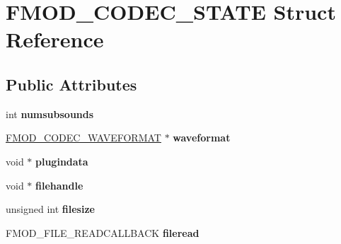 \hypertarget{struct_f_m_o_d___c_o_d_e_c___s_t_a_t_e}{\section{F\-M\-O\-D\-\_\-\-C\-O\-D\-E\-C\-\_\-\-S\-T\-A\-T\-E Struct Reference}
\label{struct_f_m_o_d___c_o_d_e_c___s_t_a_t_e}
}
\subsection*{Public Attributes}
\begin{DoxyCompactItemize}
\item 
\hypertarget{struct_f_m_o_d___c_o_d_e_c___s_t_a_t_e_af9c17a02d9b967fa0ececf991a654dfd}{int {\bfseries numsubsounds}}\label{struct_f_m_o_d___c_o_d_e_c___s_t_a_t_e_af9c17a02d9b967fa0ececf991a654dfd}

\item 
\hypertarget{struct_f_m_o_d___c_o_d_e_c___s_t_a_t_e_a785115172e17e38c3baf764e8f67b962}{\hyperlink{struct_f_m_o_d___c_o_d_e_c___w_a_v_e_f_o_r_m_a_t}{F\-M\-O\-D\-\_\-\-C\-O\-D\-E\-C\-\_\-\-W\-A\-V\-E\-F\-O\-R\-M\-A\-T} $\ast$ {\bfseries waveformat}}\label{struct_f_m_o_d___c_o_d_e_c___s_t_a_t_e_a785115172e17e38c3baf764e8f67b962}

\item 
\hypertarget{struct_f_m_o_d___c_o_d_e_c___s_t_a_t_e_a8201fa8b60e1cf571ac0d66e678b3928}{void $\ast$ {\bfseries plugindata}}\label{struct_f_m_o_d___c_o_d_e_c___s_t_a_t_e_a8201fa8b60e1cf571ac0d66e678b3928}

\item 
\hypertarget{struct_f_m_o_d___c_o_d_e_c___s_t_a_t_e_af70df892eb7bc2cb3b29854536fad747}{void $\ast$ {\bfseries filehandle}}\label{struct_f_m_o_d___c_o_d_e_c___s_t_a_t_e_af70df892eb7bc2cb3b29854536fad747}

\item 
\hypertarget{struct_f_m_o_d___c_o_d_e_c___s_t_a_t_e_af314546d98e746687bfeaae8a59f792c}{unsigned int {\bfseries filesize}}\label{struct_f_m_o_d___c_o_d_e_c___s_t_a_t_e_af314546d98e746687bfeaae8a59f792c}

\item 
\hypertarget{struct_f_m_o_d___c_o_d_e_c___s_t_a_t_e_a5ae058ad0c24eb2766b30a56e63dc6d1}{F\-M\-O\-D\-\_\-\-F\-I\-L\-E\-\_\-\-R\-E\-A\-D\-C\-A\-L\-L\-B\-A\-C\-K {\bfseries fileread}}\label{struct_f_m_o_d___c_o_d_e_c___s_t_a_t_e_a5ae058ad0c24eb2766b30a56e63dc6d1}


\end{DoxyCompactItemize}
